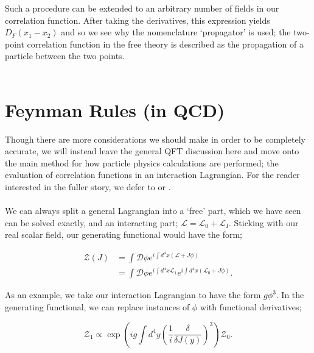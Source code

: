 Such a procedure can be extended to an arbitrary number of fields in our correlation function. After taking the derivatives, this expression yields $D_F(x_1 - x_2)$ and so we see why the nomenclature `propagator' is used; the two-point correlation function in the free theory is described as the propagation of a particle between the two points.  \\
\\

\section{Feynman Rules (in QCD)}

Though there are more considerations we should make in order to be completely accurate, we will instead leave the general QFT discussion here and move onto the main method for how particle physics calculations are performed; the evaluation of correlation functions in an interaction Lagrangian. For the reader interested in the fuller story, we defer to \cite{Peskin1995} or \cite{Srednicki2007}. \\
\\
We can always split a general Lagrangian into a `free' part, which we have seen can be solved exactly, and an interacting part; $\mathscr{L} = \mathscr{L}_0 + \mathscr{L}_I$. Sticking with our real scalar field, our generating functional would have the form;

\begin{equation}
\begin{split}
\mathcal{Z}(J) &= \int \mathcal{D} \phi e^{i \int d^4 x (\mathscr{L} + J \phi)} \\
&= \int \mathcal{D} \phi e^{i \int d^4 x \mathscr{L}_1} e^{i \int d^4 x (\mathscr{L}_0 + J \phi)}.
\end{split}
\end{equation}

As an example, we take our interaction Lagrangian to have the form $g \phi^3$. In the generating functional, we can replace instances of $\phi$ with functional derivatives;

\begin{equation}
\mathcal{Z}_1 \propto \exp \left( i g \int d^4 y \left(\frac{1}{i} \frac{\delta}{\delta J(y)} \right)^3 \right) \mathcal{Z}_0.
\end{equation}

